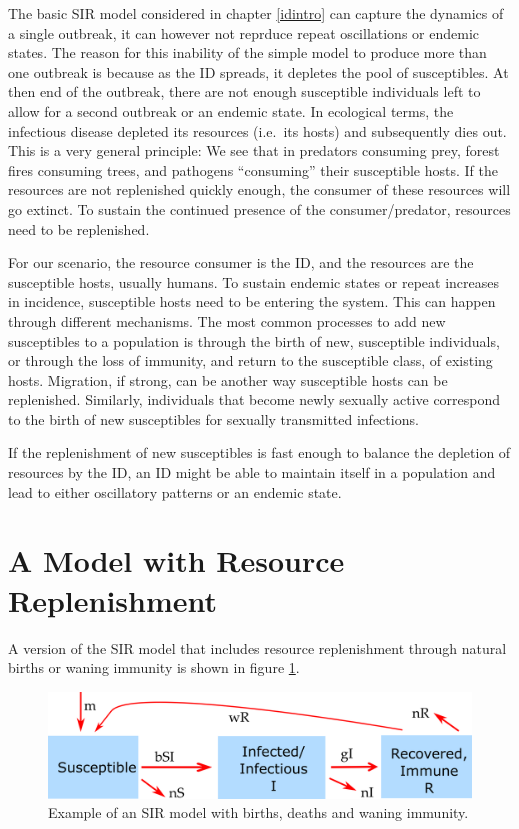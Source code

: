 \documentclass[]{book}
\theoremstyle{definition}
\theoremstyle{definition}
\theoremstyle{definition}
\theoremstyle{remark}
\begin{document}
The basic SIR model considered in chapter \ref{idintro} can capture the
dynamics of a single outbreak, it can however not reprduce repeat
oscillations or endemic states. The reason for this inability of the
simple model to produce more than one outbreak is because as the ID
spreads, it depletes the pool of susceptibles. At then end of the
outbreak, there are not enough susceptible individuals left to allow for
a second outbreak or an endemic state. In ecological terms, the
infectious disease depleted its resources (i.e.~its hosts) and
subsequently dies out. This is a very general principle: We see that in
predators consuming prey, forest fires consuming trees, and pathogens
``consuming'' their susceptible hosts. If the resources are not
replenished quickly enough, the consumer of these resources will go
extinct. To sustain the continued presence of the consumer/predator,
resources need to be replenished.

For our scenario, the resource consumer is the ID, and the resources are
the susceptible hosts, usually humans. To sustain endemic states or
repeat increases in incidence, susceptible hosts need to be entering the
system. This can happen through different mechanisms. The most common
processes to add new susceptibles to a population is through the birth
of new, susceptible individuals, or through the loss of immunity, and
return to the susceptible class, of existing hosts. Migration, if
strong, can be another way susceptible hosts can be replenished.
Similarly, individuals that become newly sexually active correspond to
the birth of new susceptibles for sexually transmitted infections.

If the replenishment of new susceptibles is fast enough to balance the
depletion of resources by the ID, an ID might be able to maintain itself
in a population and lead to either oscillatory patterns or an endemic
state.

\section{A Model with Resource
Replenishment}\label{a-model-with-resource-replenishment}

A version of the SIR model that includes resource replenishment through
natural births or waning immunity is shown in figure
\ref{fig:birthdeathdmodel}.

\begin{figure}
\centering
\includegraphics{./images/R0modelfigure.png}
\caption{\label{fig:birthdeathdmodel}Example of an SIR model with births,
deaths and waning immunity.}
\end{figure}
\end{document}
